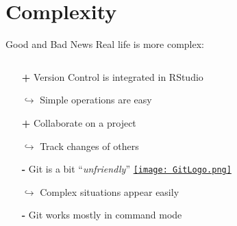 \documentclass[xcolor=x11names,compress]{beamer}
\renewcommand{\(}{\begin{columns}}
\renewcommand{\)}{\end{columns}}
\newcommand{\<}[1]{\begin{column}{#1}}
\renewcommand{\>}{\end{column}}
\begin{document}
\section{Complexity}

\begin{frame}{Good and Bad News}
Real life is more complex:
\pause
\begin{columns}[t]
\begin{column}{0.6\textwidth}
\begin{itemize}[<+->]
        \item[\textbf{+}] Version Control is integrated in RStudio
        \item[$\hookrightarrow$] Simple operations are easy
        \item[\textbf{+}] Collaborate on a project
        \item[$\hookrightarrow$] Track changes of others
        \item[\textbf{-}] Git is a bit  ``\emph{unfriendly}'' \href{https://git-scm.com/}{\texttt{[image: GitLogo.png]}}
        \item[$\hookrightarrow$] Complex situations appear easily
        \item[\textbf{-}] Git works mostly in command mode
    \end{itemize}
 \end{column}
  \begin{column}{0.4\textwidth}
    \begin{center}
    \begin{itemize}

    \end{itemize}
    \end{center}
  \end{column}
\end{columns}
\end{frame}
\end{document}
